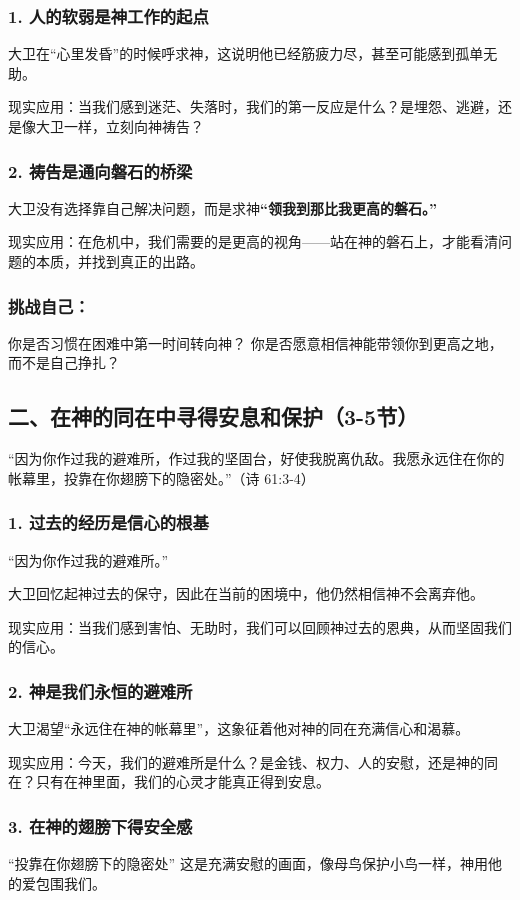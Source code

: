 \documentclass[a4paper, 12pt]{article}
\begin{document}
\subsubsection*{1. 人的软弱是神工作的起点}
\hspace{0.6cm}大卫在“心里发昏”的时候呼求神，这说明他已经筋疲力尽，甚至可能感到孤单无助。

现实应用：当我们感到迷茫、失落时，我们的第一反应是什么？是埋怨、逃避，还是像大卫一样，立刻向神祷告？
\subsubsection*{2. 祷告是通向磐石的桥梁}
\hspace{0.6cm}大卫没有选择靠自己解决问题，而是求神\textbf{“领我到那比我更高的磐石。”}

现实应用：在危机中，我们需要的是更高的视角——站在神的磐石上，才能看清问题的本质，并找到真正的出路。
\subsubsection*{挑战自己：}
你是否习惯在困难中第一时间转向神？
你是否愿意相信神能带领你到更高之地，而不是自己挣扎？
\subsection*{二、在神的同在中寻得安息和保护（3-5节）}
“因为你作过我的避难所，作过我的坚固台，好使我脱离仇敌。我愿永远住在你的帐幕里，投靠在你翅膀下的隐密处。”（诗 61:3-4）

\subsubsection*{1. 过去的经历是信心的根基}
“因为你作过我的避难所。”

大卫回忆起神过去的保守，因此在当前的困境中，他仍然相信神不会离弃他。

现实应用：当我们感到害怕、无助时，我们可以回顾神过去的恩典，从而坚固我们的信心。
\subsubsection*{2. 神是我们永恒的避难所}
\hspace{0.6cm}大卫渴望“永远住在神的帐幕里”，这象征着他对神的同在充满信心和渴慕。

现实应用：今天，我们的避难所是什么？是金钱、权力、人的安慰，还是神的同在？只有在神里面，我们的心灵才能真正得到安息。
\subsubsection*{3. 在神的翅膀下得安全感}
\hspace{0.6cm}“投靠在你翅膀下的隐密处” 这是充满安慰的画面，像母鸟保护小鸟一样，神用他的爱包围我们。
\end{document}
